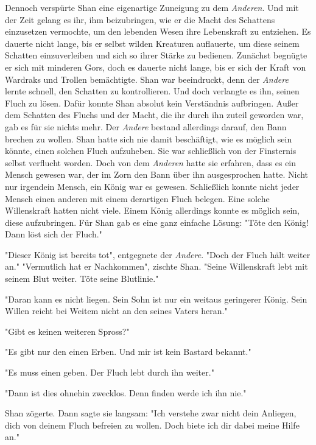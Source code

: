 \documentclass[10pt, a4paper, oneside]{book}
\begin{document}
\begin{multicols}{2}
Dennoch verspürte Shan eine eigenartige Zuneigung zu dem \textit{Anderen}. Und mit der Zeit gelang es ihr, ihm beizubringen, wie er die Macht des Schattens einzusetzen vermochte, um den lebenden Wesen ihre Lebenskraft zu entziehen. Es dauerte nicht lange, bis er selbst wilden Kreaturen auflauerte, um diese seinem Schatten einzuverleiben und sich so ihrer Stärke zu bedienen. Zunächst begnügte er sich mit minderen Gors, doch es dauerte nicht lange, bis er sich der Kraft von Wardraks und Trollen bemächtigte. Shan war beeindruckt, denn der \textit{Andere} lernte schnell, den Schatten zu kontrollieren. Und doch verlangte es ihn, seinen Fluch zu lösen. Dafür konnte Shan absolut kein Verständnis aufbringen. Außer dem Schatten des Fluchs und der Macht, die ihr durch ihn zuteil geworden war, gab es für sie nichts mehr. Der \textit{Andere} bestand allerdings darauf, den Bann brechen zu wollen. Shan hatte sich nie damit beschäftigt, wie es möglich sein könnte, einen solchen Fluch aufzuheben. Sie war schließlich von der Finsternis selbst verflucht worden. Doch von dem \textit{Anderen} hatte sie erfahren, dass es ein Mensch gewesen war, der im Zorn den Bann über ihn ausgesprochen hatte. Nicht nur irgendein Mensch, ein König war es gewesen. Schließlich konnte nicht jeder Mensch einen anderen mit einem derartigen Fluch belegen. Eine solche Willenskraft hatten nicht viele. Einem König allerdings konnte es möglich sein, diese aufzubringen. Für Shan gab es eine ganz einfache Lösung: "Töte den König! Dann löst sich der Fluch."\bigskip

"Dieser König ist bereits tot", entgegnete der \textit{Andere}. "Doch der Fluch hält weiter an." "Vermutlich hat er Nachkommen", zischte Shan. "Seine Willenskraft lebt mit seinem Blut weiter. Töte seine Blutlinie."\bigskip

"Daran kann es nicht liegen. Sein Sohn ist nur ein weitaus geringerer König. Sein Willen reicht bei Weitem nicht an den seines Vaters heran."\bigskip

"Gibt es keinen weiteren Spross?"\bigskip

"Es gibt nur den einen Erben. Und mir ist kein Bastard bekannt."\bigskip

"Es muss einen geben. Der Fluch lebt durch ihn weiter."\bigskip

"Dann ist dies ohnehin zwecklos. Denn finden werde ich ihn nie."\bigskip

Shan zögerte. Dann sagte sie langsam: "Ich verstehe zwar nicht dein Anliegen, dich von deinem Fluch befreien zu wollen. Doch biete ich dir dabei meine Hilfe an."\bigskip


\end{multicols}
\end{document}
